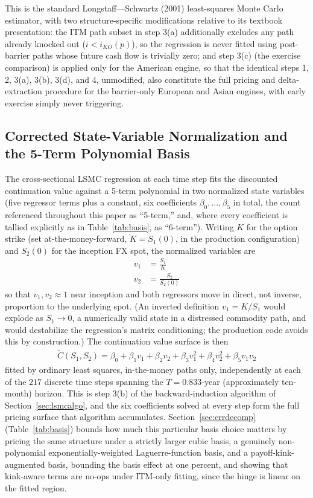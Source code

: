 \documentclass[11pt,a4paper]{article}
\begin{document}
This is the standard Longstaff---Schwartz (2001) least-squares Monte Carlo estimator, with two structure-specific modifications relative to its textbook presentation: the ITM path subset in step 3(a) additionally excludes any path already knocked out ($i<i_{KO}(p)$), so the regression is never fitted using post-barrier paths whose future cash flow is trivially zero; and step 3(c) (the exercise comparison) is applied only for the American engine, so that the identical steps 1, 2, 3(a), 3(b), 3(d), and 4, unmodified, also constitute the full pricing and delta-extraction procedure for the barrier-only European and Asian engines, with early exercise simply never triggering.

\subsection{Corrected State-Variable Normalization and the 5-Term Polynomial Basis}
\label{sec:basis}

The cross-sectional LSMC regression at each time step fits the discounted continuation value against a 5-term polynomial in two normalized state variables (five regressor terms plus a constant, six coefficients $\beta_0,\ldots,\beta_5$ in total, the count referenced throughout this paper as ``5-term,'' and, where every coefficient is tallied explicitly as in Table~\ref{tab:basis}, as ``6-term''). Writing $K$ for the option strike (set at-the-money-forward, $K=S_1(0)$, in the production configuration) and $S_2(0)$ for the inception FX spot, the normalized variables are
\begin{align}
v_1 &= \frac{S_1}{K} \\
v_2 &= \frac{S_2}{S_2(0)}
\end{align}
so that $v_1,v_2\approx 1$ near inception and both regressors move in direct, not inverse, proportion to the underlying spot. (An inverted definition $v_1=K/S_1$ would explode as $S_1\to 0$, a numerically valid state in a distressed commodity path, and would destabilize the regression's matrix conditioning; the production code avoids this by construction.) The continuation value surface is then
\begin{align}
\tilde C(S_1,S_2) = \beta_0+\beta_1 v_1+\beta_2 v_2+\beta_3 v_1^2+\beta_4 v_2^2+\beta_5 v_1 v_2
\end{align}
fitted by ordinary least squares, in-the-money paths only, independently at each of the $217$ discrete time steps spanning the $T=0.833$-year (approximately ten-month) horizon. This is step 3(b) of the backward-induction algorithm of Section~\ref{sec:lsmcalgo}, and the six coefficients solved at every step form the full pricing surface that algorithm accumulates. Section~\ref{sec:errdecomp} (Table~\ref{tab:basis}) bounds how much this particular basis choice matters by pricing the same structure under a strictly larger cubic basis, a genuinely non-polynomial exponentially-weighted Laguerre-function basis, and a payoff-kink-augmented basis, bounding the basis effect at one percent, and showing that kink-aware terms are no-ops under ITM-only fitting, since the hinge is linear on the fitted region.
\end{document}
